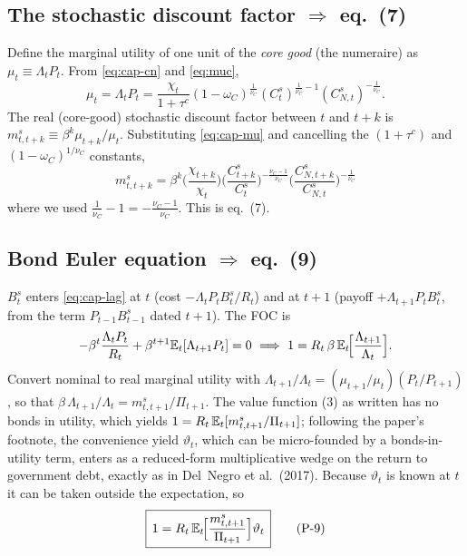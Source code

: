 \subsection{The stochastic discount factor \texorpdfstring{$\Rightarrow$}{=>} eq.\ (7)}
Define the marginal utility of one unit of the \emph{core good} (the numeraire) as
$\mu_t\equiv\Lambda_t P_t$. From \eqref{eq:cap-cn} and \eqref{eq:muc},
\begin{equation}\label{eq:cap-mu}
\mu_t=\Lambda_tP_t=\frac{\chi_t}{1+\tau^c}(1-\omega_C)^{\frac1{\nu_C}}
(C^s_t)^{\frac1{\nu_C}-1}(C^s_{N,t})^{-\frac1{\nu_C}} .
\end{equation}
The real (core-good) stochastic discount factor between $t$ and $t+k$ is
$m^s_{t,t+k}\equiv\beta^k\mu_{t+k}/\mu_t$. Substituting \eqref{eq:cap-mu} and cancelling the
$(1+\tau^c)$ and $(1-\omega_C)^{1/\nu_C}$ constants,
\begin{equation}\label{eq:7}
\boxed{\,m^s_{t,t+k}=\beta^k\Big(\frac{\chi_{t+k}}{\chi_t}\Big)
\Big(\frac{C^s_{t+k}}{C^s_t}\Big)^{-\frac{\nu_C-1}{\nu_C}}
\Big(\frac{C^s_{N,t+k}}{C^s_{N,t}}\Big)^{-\frac1{\nu_C}}\,}
\tag{P-7}
\end{equation}
where we used $\tfrac1{\nu_C}-1=-\tfrac{\nu_C-1}{\nu_C}$. This is eq.\ (7).

\subsection{Bond Euler equation \texorpdfstring{$\Rightarrow$}{=>} eq.\ (9)}
$B^s_t$ enters \eqref{eq:cap-lag} at $t$ (cost $-\Lambda_t P_t B^s_t/R_t$) and at $t+1$ (payoff
$+\Lambda_{t+1}P_t B^s_t$, from the term $P_{t-1}B^s_{t-1}$ dated $t+1$). The FOC is
\[
-\beta^t\frac{\Lambda_tP_t}{R_t}+\beta^{t+1}\mathbb{E}_t[\Lambda_{t+1}P_t]=0
\ \Longrightarrow\
1=R_t\,\beta\,\mathbb{E}_t\!\Big[\frac{\Lambda_{t+1}}{\Lambda_t}\Big].
\]
Convert nominal to real marginal utility with $\Lambda_{t+1}/\Lambda_t=(\mu_{t+1}/\mu_t)(P_t/P_{t+1})$,
so that $\beta\,\Lambda_{t+1}/\Lambda_t=m^s_{t,t+1}/\Pi_{t+1}$. The value function (3) as written has no
bonds in utility, which yields $1=R_t\,\mathbb{E}_t[m^s_{t,t+1}/\Pi_{t+1}]$; following the paper's footnote, the
convenience yield $\vartheta_t$, which can be micro-founded by a bonds-in-utility term, enters as a
reduced-form multiplicative wedge on the return to government debt, exactly as in Del~Negro et al.\
(2017). Because $\vartheta_t$ is known at $t$ it can be taken outside the expectation, so
\begin{equation}\label{eq:9}
\boxed{\,1=R_t\,\mathbb{E}_t\!\Big[\frac{m^s_{t,t+1}}{\Pi_{t+1}}\Big]\vartheta_t\,}
\tag{P-9}
\end{equation}

